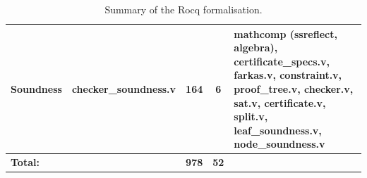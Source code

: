 \begin{table}[ht]
\begin{tabularx}{\textwidth}{
    @{}
    p{}
    p{}
    c
    c
    X
    @{}}
Soundness
&
checker\_soundness.v
&
164
&
6
&
mathcomp (ssreflect, algebra),
certificate\_specs.v, farkas.v,
constraint.v, proof\_tree.v,
checker.v, sat.v, certificate.v,
split.v, leaf\_soundness.v,
node\_soundness.v
\\
\midrule

\textbf{Total:}
&
&
\textbf{978}
&
\textbf{52}
&
\\

\bottomrule
\end{tabularx}
\caption{Summary of the Rocq formalisation.}
\end{table}

